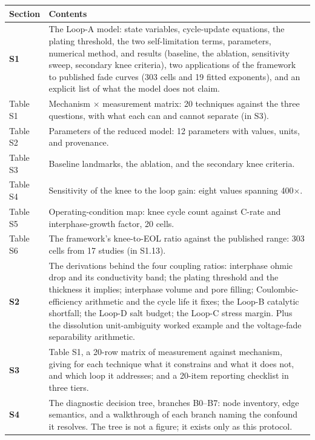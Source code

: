 \documentclass[11pt,a4paper]{article}
\renewcommand{\arraystretch}{1.15}
\begin{document}
\begingroup\small
\setlength{\tabcolsep}{3pt}
\renewcommand{\arraystretch}{1.12}
\sloppy
\begin{tabular}{@{}>{\raggedright\arraybackslash}p{}>{\raggedright\arraybackslash}p{}@{}}
\hline
\textbf{Section} & \textbf{Contents} \\ \hline
\textbf{S1} & The Loop-A model: state variables, cycle-update equations, the plating threshold, the two self-limitation terms, parameters, numerical method, and results (baseline, the ablation, sensitivity sweep, secondary knee criteria), two applications of the framework to published fade curves (303 cells and 19 fitted exponents), and an explicit list of what the model does not claim. \\
\hline
Table S1 & Mechanism \ensuremath{\times} measurement matrix: 20 techniques against the three questions, with what each can and cannot separate (in S3). \\
\hline
Table S2 & Parameters of the reduced model: 12 parameters with values, units, and provenance. \\
\hline
Table S3 & Baseline landmarks, the ablation, and the secondary knee criteria. \\
\hline
Table S4 & Sensitivity of the knee to the loop gain: eight values spanning 400\ensuremath{\times}. \\
\hline
Table S5 & Operating-condition map: knee cycle count against C-rate and interphase-growth factor, 20 cells. \\
\hline
Table S6 & The framework's knee-to-EOL ratio against the published range: 303 cells from 17 studies (in S1.13). \\
\hline
\textbf{S2} & The derivations behind the four coupling ratios: interphase ohmic drop and its conductivity band; the plating threshold and the thickness it implies; interphase volume and pore filling; Coulombic-efficiency arithmetic and the cycle life it fixes; the Loop-B catalytic shortfall; the Loop-D salt budget; the Loop-C stress margin. Plus the dissolution unit-ambiguity worked example and the voltage-fade separability arithmetic. \\
\hline
\textbf{S3} & Table S1, a 20-row matrix of measurement against mechanism, giving for each technique what it constrains and what it does not, and which loop it addresses; and a 20-item reporting checklist in three tiers. \\
\hline
\textbf{S4} & The diagnostic decision tree, branches B0--B7: node inventory, edge semantics, and a walkthrough of each branch naming the confound it resolves. The tree is not a figure; it exists only as this protocol. \\
\hline
\end{tabular}
\endgroup
\end{document}
